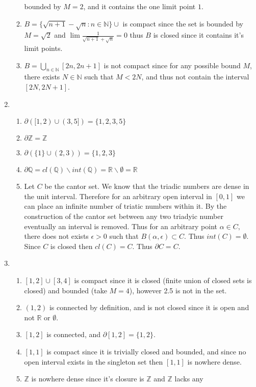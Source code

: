 \documentclass[12pt, letterpaper]{article}
\newcommand{\Z}{\mathbb{Z}}
\newcommand{\N}{\mathbb{N}}
\newcommand{\R}{\mathbb{R}}
\newcommand{\Q}{\mathbb{Q}}
\begin{document}
\begin{enumerate}
\begin{enumerate}
		bounded by $M = 2$, and it contains the one limit point $1$.
		\item $B = \{\sqrt{n+1} - \sqrt{n} : n \in \N\} \cup $ is compact since 
		the set is bounded by $M = \sqrt{2}$ and $\lim \frac{1}{\sqrt{n+1} + \sqrt{n}} = 0$ thus $B$ is closed since it contains it's limit points.  
		\item $B = \bigcup_{n \in \N} [2n,2n+1]$ is not compact since for any 
		possible bound $M$, there exists $N \in \N$ such that $M < 2N$, and thus 
		not contain the interval $[2N,2N+1]$.  
	\end{enumerate}
	\item 
	\begin{enumerate}
		\item $\partial([1,2) \cup (3,5]) = \{1,2,3,5\}$
		\item $\partial \Z = \Z$
		\item $\partial (\{1\}\cup (2,3)) = \{1,2,3\}$
		\item $\partial \Q = cl(\Q) \backslash int(\Q) = \R \backslash \emptyset = \R$
		\item Let $C$ be the cantor set.  We know that the triadic numbers are dense in the unit interval.  Therefore for an arbitrary open interval in $[0,1]$
		we can place an infinite number of triatic numbers within it.  By the 
		construction of the cantor set between any two triadyic number eventually
		an interval is removed.  Thus for an arbitrary point $\alpha \in C,$
		there does not exists $\epsilon > 0$ such that $B(\alpha,\epsilon) \subset C$.  Thus $int(C) = \emptyset$.  Since $C$ is closed then $cl(C) = C$.  Thus $\partial C = C$.  
	\end{enumerate}
	\item \begin{enumerate}
		\item $[1,2]\cup [3,4]$ is compact since it is closed (finite union of closed sets is closed) and bounded (take $M = 4$), however 2.5 is not in the set.
		\item $(1,2)$ is connected by definition, and is not closed since it is 
		open and not $\R$ or $\emptyset$.
		\item $[1,2]$ is connected, and $\partial [1,2] = \{1,2\}$.    
		\item $[1,1]$ is compact since it is trivially closed and bounded, and 
		since no open interval exists in the singleton set then $[1,1]$ is nowhere dense.  
		\item $\Z$ is nowhere dense since it's closure is $\Z$ and $\Z$ lacks any 

\end{enumerate}
\end{enumerate}
\end{document}
